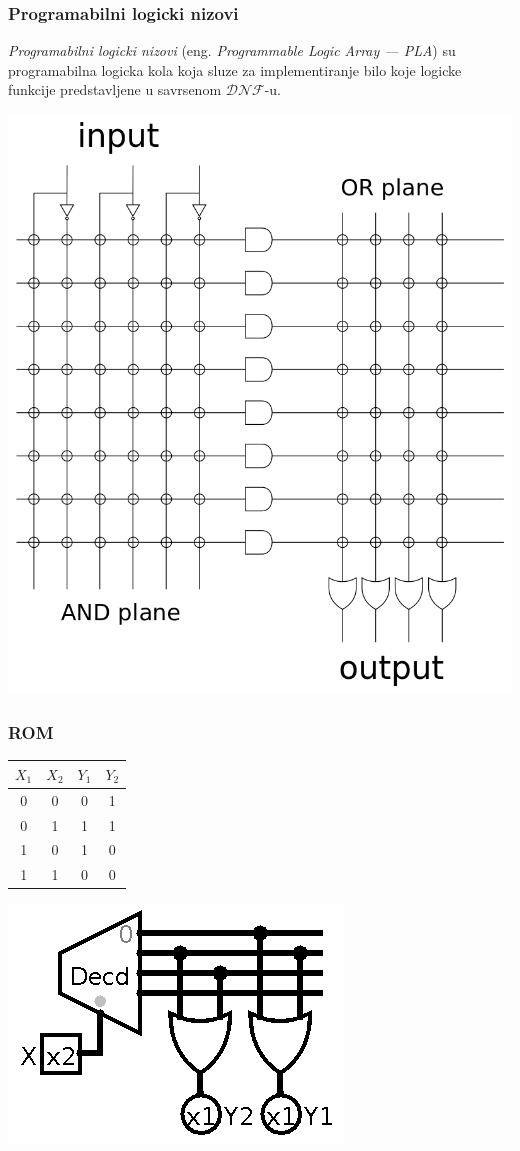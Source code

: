 \documentclass[12p,a4paper]{article}
\begin{document}
\begin{multicols}{2}
    \subsubsection{Programabilni logicki nizovi}

    \emph{Programabilni logicki nizovi} 
    (eng. \emph{Programmable Logic Array --- PLA}) su programabilna logicka 
    kola koja sluze za implementiranje bilo koje logicke funkcije 
    predstavljene u savrsenom $\mathcal{DNF}$-u.

    \includegraphics[width=0.8\columnwidth]{Figures/pla.png}

    \subsubsection{ROM}

    \begin{tabular}{*{4}{c}}
        $X_1$ & $X_2$ & $Y_1$ & $Y_2$ \\
        \midrule    
        0 & 0 & 0 & 1 \\
        0 & 1 & 1 & 1 \\
        1 & 0 & 1 & 0 \\
        1 & 1 & 0 & 0 \\
    \end{tabular}

    \includegraphics[width=0.5\columnwidth]{Figures/rom.png}


\end{multicols}
\end{document}

